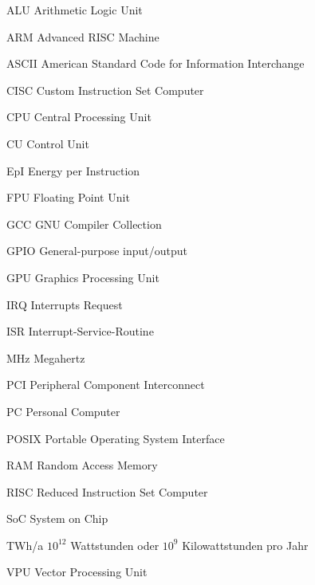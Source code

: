 \begin{abkuerzungen}[MUSTER] %
\item[ALU] Arithmetic Logic Unit
\item[ARM] Advanced RISC Machine
\item[ASCII] American Standard Code for Information Interchange
\item[CISC] Custom Instruction Set Computer
\item[CPU] Central Processing Unit
\item[CU] Control Unit
\item[EpI] Energy per Instruction
\item[FPU] Floating Point Unit
\item[GCC] GNU Compiler Collection
\item[GPIO] General-purpose input/output
\item[GPU] Graphics Processing Unit
\item[IRQ] Interrupts Request
\item[ISR] Interrupt-Service-Routine
\item[MHz] Megahertz
\item[PCI] Peripheral Component Interconnect
\item[PC] Personal Computer
\item[POSIX] Portable Operating System Interface
\item[RAM] Random Access Memory
\item[RISC] Reduced Instruction Set Computer
\item[SoC] System on Chip
\item[TWh/a] $10^{12}$ Wattstunden oder $10^{9}$ Kilowattstunden pro Jahr
\item[VPU] Vector Processing Unit
\end{abkuerzungen}
